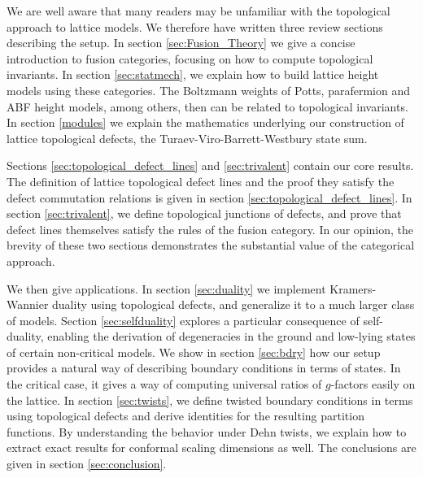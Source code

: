 We are well aware that many readers may be unfamiliar with the topological approach to lattice models. We therefore have written three review sections describing the setup. In section \ref{sec:Fusion_Theory} we give a concise introduction to fusion categories, focusing on how to compute topological invariants. In section \ref{sec:statmech}, we explain how to build lattice height models using these categories. The Boltzmann weights of Potts, parafermion and ABF height models, among others, then can be related to topological invariants. In section \ref{modules} we explain the mathematics underlying our construction of lattice topological defects, the Turaev-Viro-Barrett-Westbury state sum.

Sections \ref{sec:topological_defect_lines} and \ref{sec:trivalent} contain our core results. The definition of lattice topological defect lines and the proof they satisfy the defect commutation relations is given in section \ref{sec:topological_defect_lines}. In section \ref{sec:trivalent}, we define topological junctions of defects, and prove that defect lines themselves satisfy the rules of the fusion category. In our opinion, the brevity of these two sections demonstrates the substantial value of the categorical approach.

We then give applications. In section \ref{sec:duality} we implement Kramers-Wannier duality using topological defects, and generalize it to a much larger class of models. Section \ref{sec:selfduality} explores a particular consequence of self-duality, enabling the derivation of degeneracies in the ground and low-lying states of certain non-critical models. We show in section \ref{sec:bdry} how our setup provides a natural way of describing boundary conditions in terms of states. In the critical case, it gives a way of computing universal ratios of $g$-factors easily on the lattice. In section \ref{sec:twists}, we define twisted boundary conditions in terms using topological defects and derive identities for the resulting partition functions. By understanding the behavior under Dehn twists, we explain how to extract exact results for conformal scaling dimensions as well. The conclusions are given in section \ref{sec:conclusion}. 






